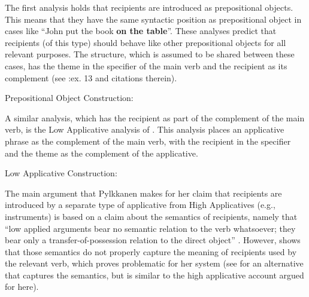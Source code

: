 The first analysis holds that recipients are introduced as prepositional objects. This means that they have the same syntactic position as prepositional object in cases like ``John put the book \textbf{on the table}''. These analyses predict that recipients (of this type) should behave like other prepositional objects for all relevant purposes. The structure, which is assumed to be shared between these cases, has the theme in the specifier of the main verb and the recipient as its complement (see \citealt{Larson.1988}:ex. 13 and citations therein).

\begin{exe}
	\ex Prepositional Object Construction:\label{ex:POC} \\
\end{exe}


A similar analysis, which has the recipient as part of the complement of the main verb, is the Low Applicative analysis of \cite{Pylkkanen.2001}. This analysis places an applicative phrase as the complement of the main verb, with the recipient in the specifier and the theme as the complement of the applicative. 
\begin{exe}
\ex Low Applicative Construction: \\
\end{exe}

The main argument that Pylkkanen makes for her claim that recipients are introduced by a separate type of applicative from High Applicatives (e.g., instruments) is based on a claim about the semantics of recipients, namely that ``low applied arguments bear no semantic relation to the verb whatsoever; they bear only a transfer-of-possession relation to the direct object'' \citep{Pylkkanen.2008}. However, \cite{Larson.2010} shows that those semantics do not properly capture the meaning of recipients used by the relevant verb, which proves problematic for her system (see \citealt{Georgala.2012} for an alternative that captures the semantics, but is similar to the high applicative account argued for here).

